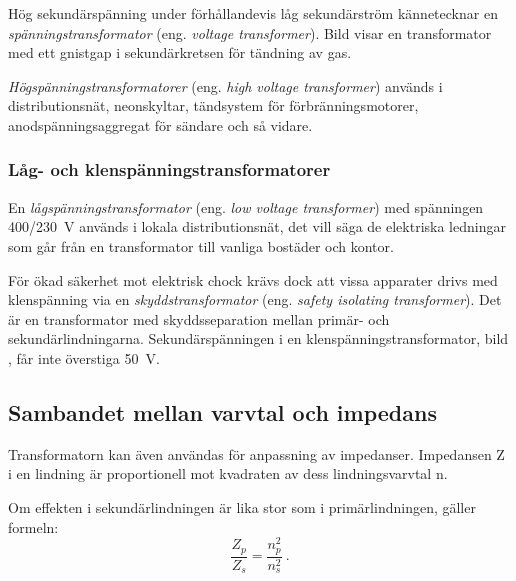 Hög sekundärspänning under förhållandevis låg sekundärström kännetecknar en
\emph{spänningstransformator} (eng. \emph{voltage transformer}).
Bild  visar en transformator med ett gnistgap i
sekundärkretsen för tändning av gas.

\emph{Högspänningstransformatorer} (eng. \emph{high voltage transformer})
används i distributionsnät, neonskyltar, tändsystem för förbränningsmotorer,
anodspänningsaggregat för sändare och så vidare.


\newpage
\subsubsection{Låg- och klenspänningstransformatorer}


En \emph{lågspänningstransformator} (eng. \emph{low voltage transformer}) med
spänningen 400/\qty{230}{\volt} används i lokala distributionsnät, det vill säga
de elektriska ledningar som går från en transformator till vanliga bostäder och
kontor.

För ökad säkerhet mot elektrisk chock krävs dock att vissa apparater drivs med
klenspänning via en \emph{skyddstransformator}
(eng. \emph{safety isolating transformer}).
Det är en transformator med skyddsseparation mellan primär- och
sekundärlindningarna.
Sekundärspänningen i en klenspänningstransformator, bild ,
får inte överstiga \qty{50}{\volt}.

\newpage
\subsection{Sambandet mellan varvtal och impedans}


Transformatorn kan även användas för anpassning av impedanser.
Impedansen Z i en lindning är proportionell mot kvadraten av dess
lindningsvarvtal n.

Om effekten i sekundärlindningen är lika stor som i primärlindningen, gäller
formeln:
%
\[\dfrac{Z_p}{Z_s} = \dfrac{n_p^2}{n_s^2}~.\]
